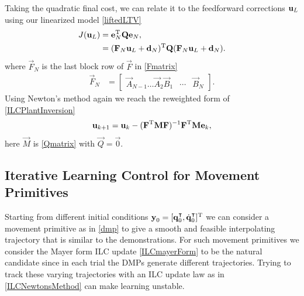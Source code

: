 Taking the quadratic final cost, we can relate it to the feedforward corrections $\boldsymbol{\mathrm{u}}_L$ using our linearized model \eqref{liftedLTV}
%
\begin{equation}
\begin{aligned}
J(\boldsymbol{\mathrm{u}}_L) &= \boldsymbol{\mathrm{e}}_{N}^{\mathrm{T}}\boldsymbol{\mathrm{Q}}\boldsymbol{\mathrm{e}}_{N}, \\
&= (\boldsymbol{\mathrm{F}}_N\boldsymbol{\mathrm{u}}_L + \boldsymbol{\mathrm{d}}_N)^{\mathrm{T}}\boldsymbol{\mathrm{Q}}(\boldsymbol{\mathrm{F}}_N\boldsymbol{\mathrm{u}}_L + \boldsymbol{\mathrm{d}}_N).
\end{aligned}
\label{finalCost}
\end{equation}
%
\noindent where $\vec{F}_N$ is the last block row of $\vec{F}$ in \eqref{Fmatrix}
%
\begin{equation*}
\begin{aligned}
 \vec{F}_N &= 
 \begin{bmatrix}
  \vec{A}_{N-1} \ldots \vec{A}_2 \vec{B}_1 & \cdots & \vec{B}_N 
 \end{bmatrix}.
\end{aligned}
\end{equation*}
%
\noindent Using Newton's method again we reach the reweighted form of \eqref{ILCPlantInversion}
%
\begin{equation}
\begin{aligned}
\boldsymbol{\mathrm{u}}_{k+1} &= \boldsymbol{\mathrm{u}}_k - (\boldsymbol{\mathrm{F}}^{\mathrm{T}}\boldsymbol{\mathrm{M}}\boldsymbol{\mathrm{F}})^{-1}\boldsymbol{\mathrm{F}}^{\mathrm{T}}\boldsymbol{\mathrm{M}}\boldsymbol{\mathrm{e}}_k,\\
\end{aligned}
\label{ILCmayerForm}
\end{equation}
%
\noindent here $\vec{M}$ is \eqref{Qmatrix} with $\vec{Q} = \vec{0}$.


\subsection{Iterative Learning Control for Movement Primitives}\label{ilcOnDMP} 

Starting from different initial conditions $\boldsymbol{\mathrm{y}}_0 = [\boldsymbol{\mathrm{q}}^{\intercal}_0,\dot{\boldsymbol{\mathrm{q}}}^{\intercal}_0]^{\mathrm{T}}$ we can consider a movement primitive as in \eqref{dmp} to give a smooth and feasible interpolating trajectory that is similar to the demonstrations.
For such movement primitives we consider the Mayer form ILC update \eqref{ILCmayerForm} to be the natural candidate since in each trial the DMPs generate different trajectories. Trying to track these varying trajectories with an ILC update law as in \eqref{ILCNewtonsMethod} can make learning unstable.

